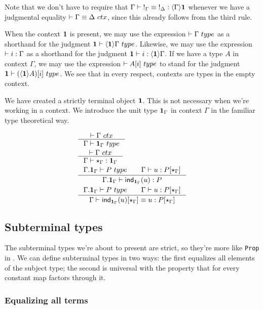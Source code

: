 Note that we don't have to require that $\jhomeq{\Gamma}{\unit}{\tounit{\Gamma}}{\tounit{\Delta}}$
whenever we have a judgmental equality $\jctxeq{\Gamma}{\Delta}$, since this already follows from the third rule.

When the context $\mathbf{1}$ is present, we may use the expression $\jtype{}{\Gamma}$
as a shorthand for the judgment $\jtype{\unit}{\ctxwk{\unit}{\Gamma}}$. Likewise,
we may use the expression $\jtermc{\Gamma}{i}$ as a shorthand
for the judgment $\jhom{\unit}{\Gamma}{i}$. If we have a type $A$ in context
$\Gamma$, we may use the expression $\jtype{}{\subst{i}{A}}$ to stand for
the judgment $\jtype{\unit}{\subst{i}{\ctxwk{\unit}{A}}}$. We see that in every
respect, contexts are types in the empty context.

We have created a strictly terminal object $\mathbf{1}$. This is not necessary when
we're working in a context. We introduce the unit type $\mathbf{1}_\Gamma$ in context
$\Gamma$ in the familiar type theoretical way.

\begin{align}
& \inference{\jctx{\Gamma}}{\jtype{\Gamma}{\unit_\Gamma}}\\
& \inference{\jctx{\Gamma}}{\jterm{\Gamma}{\unit_\Gamma}{\ttt_\Gamma}}\\
& \inference{\jtype{\ctxext{\Gamma}{\unit_\Gamma}}{P}\qquad\jterm{\Gamma}{\subst{\ttt_\Gamma}{P}}{u}}
          {\jterm{\ctxext{\Gamma}{\unit_\Gamma}}{P}{\ind{\unit_\Gamma}(u)}}\\
& \inference{\jtype{\ctxext{\Gamma}{\unit_\Gamma}}{P}\qquad\jterm{\Gamma}{\subst{\ttt_\Gamma}{P}}{u}}
          {\jtermeq{\Gamma}{\subst{\ttt_\Gamma}{P}}{\subst{\ttt_\Gamma}{\ind{\unit_\Gamma}(u)}}{u}}
\end{align}

\subsection{Subterminal types}
The subterminal types we're about to present are strict, so they're more like \verb+Prop+
in \Coq. We can define subterminal types in two ways: the first equalizes all elements
of the subject type; the second is universal with the property that for every constant
map factors through it.

\subsubsection{Equalizing all terms}

